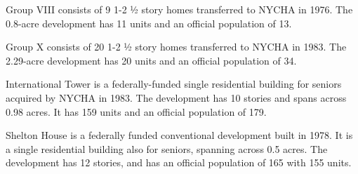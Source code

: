 Group VIII consists of 9 1-2 ½ story homes transferred to NYCHA in 1976. The 0.8-acre development has 11 units and an official population of 13. 

Group X consists of 20 1-2 ½ story homes transferred to NYCHA in 1983. The 2.29-acre development has 20 units and an official population of 34.

International Tower is a federally-funded single residential building for seniors acquired by NYCHA in 1983. The development has 10 stories and spans across 0.98 acres. It has 159 units and an official population of 179.

Shelton House is a federally funded conventional development built in 1978. It is a single residential building also for seniors, spanning across 0.5 acres. The development has 12 stories, and has an official population of 165 with 155 units.